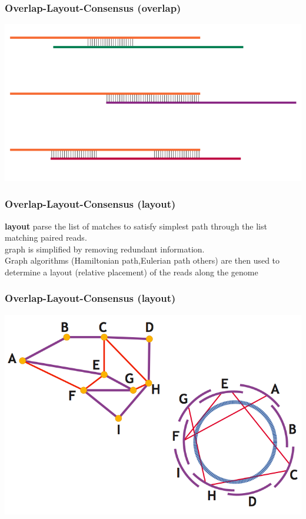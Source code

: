 \documentclass[pdf]{beamer}
\begin{document}
\begin{frame}
\frametitle{Overlap-Layout-Consensus (overlap)}
\begin{center}
\includegraphics[scale=0.5]{Figures/overlap.png}
\end{center}
\end{frame}
 
\begin{frame}
\frametitle{Overlap-Layout-Consensus (layout)}
\textbf{layout}
parse the list of matches to satisfy simplest path through the list matching paired reads.\\
graph is simplified by removing redundant information.\\
Graph algorithms (Hamiltonian path,Eulerian path others) are then used to determine a layout (relative placement) of the reads along the genome
\end{frame}


\begin{frame}
\frametitle{Overlap-Layout-Consensus (layout)}
\begin{center}
\includegraphics[scale=0.35]{Figures/layout.png}
\end{center}
\end{frame}
\end{document}
